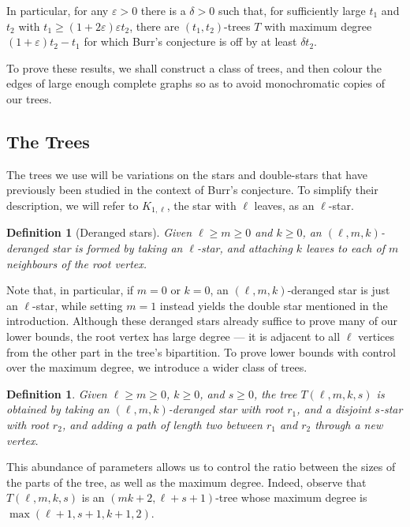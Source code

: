 \documentclass[11pt]{article}
\newtheorem{dfn}[theorem]{Definition}
\begin{document}
In particular, for any $\varepsilon > 0$ there is a $\delta > 0$ such that, for sufficiently large $t_1$ and $t_2$ with $t_1 \ge (1 + 2\varepsilon) \varepsilon t_2$, there are $(t_1,t_2)$-trees $T$ with maximum degree $(1 + \varepsilon) t_2 - t_1$ for which Burr's conjecture is off by at least $\delta t_2$.

To prove these results, we shall construct a class of trees, and then colour the edges of large enough complete graphs so as to avoid monochromatic copies of our trees.

\subsection{The Trees}

The trees we use will be variations on the stars and double-stars that have previously been studied in the context of Burr's conjecture. To simplify their description, we will refer to $K_{1,\ell}$, the star with $\ell$ leaves, as an $\ell$-star.

\begin{dfn}[Deranged stars] \label{dfn:deranged-stars}
    Given $\ell \ge m \ge 0$ and $k \ge 0$, an \emph{$(\ell, m, k)$-deranged star} is formed by taking an $\ell$-star, and attaching $k$ leaves to each of $m$ neighbours of the root vertex.
\end{dfn}

Note that, in particular, if $m = 0$ or $k=0$, an $(\ell, m, k)$-deranged star is just an $\ell$-star, while setting $m=1$ instead yields the double star mentioned in the introduction. Although these deranged stars already suffice to prove many of our lower bounds, the root vertex has large degree --- it is adjacent to all $\ell$ vertices from the other part in the tree's bipartition. To prove lower bounds with control over the maximum degree, we introduce a wider class of trees.

\begin{dfn} \label{dfn:trees}
    Given $\ell \ge m \ge 0$, $k \ge 0$, and $s \ge 0$, the tree $T(\ell, m, k, s)$ is obtained by taking an $(\ell, m, k)$-deranged star with root $r_1$, and a disjoint $s$-star with root $r_2$, and adding a path of length two between $r_1$ and $r_2$ through a new vertex.
\end{dfn}

This abundance of parameters allows us to control the ratio between the sizes of the parts of the tree, as well as the maximum degree. Indeed, observe that $T(\ell, m, k, s)$ is an $(mk + 2, \ell + s + 1)$-tree whose maximum degree is $\max( \ell + 1, s + 1, k + 1, 2)$.
\end{document}
